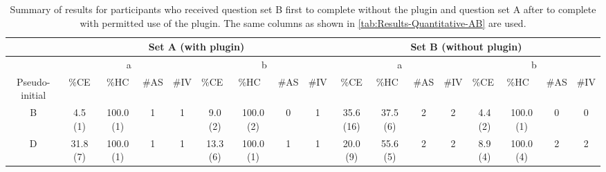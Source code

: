 \begin{landscape}
  \begin{table}[p]
    \footnotesize
    \caption{
      Summary of results for participants who received question set B first to complete without the plugin and question set A after to complete with permitted use of the plugin.
      The same columns as shown in \autoref{tab:Results-Quantitative-AB} are used.
    }
    \centering
    \begin{tabular}{@{}ccccccccccccccccc@{}}
      \toprule
      \multicolumn{1}{l}{}                & \multicolumn{8}{c}{Set A (with plugin)}                                                                                                                              & \multicolumn{8}{c}{Set B (without plugin)}                                                                                                                                                              \\ \midrule
      \multicolumn{1}{c|}{}               & \multicolumn{4}{c|}{a}                                  & \multicolumn{4}{c|}{b}                                                                                     & \multicolumn{4}{c|}{a}                                                                      & \multicolumn{4}{c}{b}                                                                                     \\ \midrule
      \multicolumn{1}{c|}{Pseudo-initial} & \%CE     & \%HC      & \#AS & \multicolumn{1}{l|}{\#IV} & \multicolumn{1}{l}{\%CE} & \multicolumn{1}{l}{\%HC} & \multicolumn{1}{l}{\#AS} & \multicolumn{1}{l|}{\#IV} & \%CE      & \multicolumn{1}{l}{\%HC} & \multicolumn{1}{l}{\#AS} & \multicolumn{1}{l|}{\#IV} & \multicolumn{1}{l}{\%CE} & \multicolumn{1}{l}{\%HC} & \multicolumn{1}{l}{\#AS} & \multicolumn{1}{l}{\#IV} \\ \midrule
      \multicolumn{1}{c|}{B}              & 4.5 (1)  & 100.0 (1) & 1    & \multicolumn{1}{c|}{1}    & 9.0 (2)                  & 100.0 (2)                & 0                        & \multicolumn{1}{c|}{1}    & 35.6 (16) & 37.5 (6)                 & 2                        & \multicolumn{1}{c|}{2}    & 4.4 (2)                  & 100.0 (1)                & 0                        & 0                        \\
      \multicolumn{1}{c|}{D}              & 31.8 (7) & 100.0 (1) & 1    & \multicolumn{1}{c|}{1}    & 13.3 (6)                 & 100.0 (1)                & 1                        & \multicolumn{1}{c|}{1}    & 20.0 (9)  & 55.6 (5)                 & 2                        & \multicolumn{1}{c|}{2}    & 8.9 (4)                  & 100.0 (4)                & 2                        & 2                        \\

\end{tabular}
\end{table}
\end{landscape}

